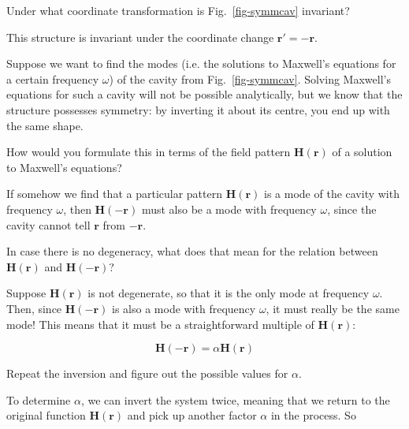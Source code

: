 \begin{cue}
Under what coordinate transformation is Fig.~\ref{fig-symmcav} invariant?   
\end{cue}

This structure is invariant under the coordinate change ${\mathbf r}' = -{\mathbf r}$.

Suppose we want to find the modes (i.e. the solutions to Maxwell's equations for a certain frequency $\omega$) of the cavity from Fig.~\ref{fig-symmcav}. Solving Maxwell's equations for such a cavity will not be possible analytically, but we know that the structure possesses symmetry: by inverting it about its centre, you end up with the same shape.

\begin{cue}
How would you formulate this in terms of the field pattern ${\mathbf H({\mathbf r})}$ of a solution to Maxwell's equations?    
\end{cue}

If somehow we find that a particular pattern ${\mathbf H({\mathbf r})}$ is a mode of the cavity with frequency $\omega$, then ${\mathbf H(-{\mathbf r})}$ must also be a mode with frequency $\omega$, since the cavity cannot tell ${\mathbf r}$ from ${-\mathbf{r}}$.

\begin{cue}
In case there is no degeneracy, what does that mean for the relation between ${\mathbf H({\mathbf r})}$ and ${\mathbf H({\mathbf{-r}})}$?    
\end{cue}

Suppose ${\mathbf H({\mathbf r})}$ is not degenerate, so that it is the only mode at frequency $\omega$. Then, since ${\mathbf H(-{\mathbf{r}})}$ is also a mode with frequency $\omega$, it must really be the same mode! This means that it must be a straightforward multiple of ${\mathbf H({\mathbf r})}$:

\begin{equation}
{\mathbf H(-{\mathbf{r}})} = \alpha {\mathbf H({\mathbf r})}
\end{equation} 

\begin{cue}
Repeat the inversion and figure out the possible values for $\alpha$.    
\end{cue}

To determine $\alpha$, we can invert the system twice, meaning that we return to the original function ${\mathbf H({\mathbf r})}$ and pick up another factor $\alpha$ in the process. So

